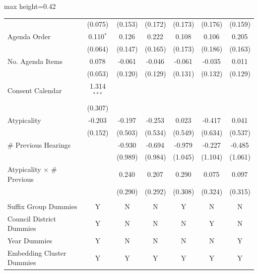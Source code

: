 \begin{table}[H]
\begin{adjustbox}{max height=0.42\textheight}
\begin{threeparttable}
\begin{tabular}{lcccccc}
 & (0.075) & (0.153) & (0.172) & (0.173) & (0.176) & (0.159) \\ [1.8ex]
Agenda Order  & 0.110$^{*}$ & 0.126$^{}$ & 0.222$^{}$ & 0.108$^{}$ & 0.106$^{}$ & 0.205$^{}$ \\
 & (0.064) & (0.147) & (0.165) & (0.173) & (0.186) & (0.163) \\ [1.8ex]
No. Agenda Items  & 0.078$^{}$ & -0.061$^{}$ & -0.046$^{}$ & -0.061$^{}$ & -0.035$^{}$ & 0.011$^{}$ \\
 & (0.053) & (0.120) & (0.129) & (0.131) & (0.132) & (0.129) \\ [1.8ex]
Consent Calendar  & 1.314$^{***}$ &  &  &  &  &  \\
 & (0.307) &  &  &  &  &  \\ [1.8ex]
Atypicality  & -0.203$^{}$ & -0.197$^{}$ & -0.253$^{}$ & 0.023$^{}$ & -0.417$^{}$ & 0.041$^{}$ \\
 & (0.152) & (0.503) & (0.534) & (0.549) & (0.634) & (0.537) \\ [1.8ex]
\# Previous Hearings  &  & -0.930$^{}$ & -0.694$^{}$ & -0.979$^{}$ & -0.227$^{}$ & -0.485$^{}$ \\
 &  & (0.989) & (0.984) & (1.045) & (1.104) & (1.061) \\ [1.8ex]
Atypicality $\times$ \# Previous  &  & 0.240$^{}$ & 0.207$^{}$ & 0.290$^{}$ & 0.075$^{}$ & 0.097$^{}$ \\
 &  & (0.290) & (0.292) & (0.308) & (0.324) & (0.315) \\ [1.8ex]

 & & & & \\ 
Suffix Group Dummies  & Y  & N  & N  & Y  & N  & N  \\ 
Council District Dummies  & Y  & N  & N  & N  & Y  & N  \\ 
Year Dummies  & Y  & N  & N  & N  & N  & Y  \\ 
Embedding Cluster Dummies  & Y  & Y  & Y  & Y  & Y  & Y  \\ 


\end{tabular}
\end{threeparttable}
\end{adjustbox}
\end{table}
